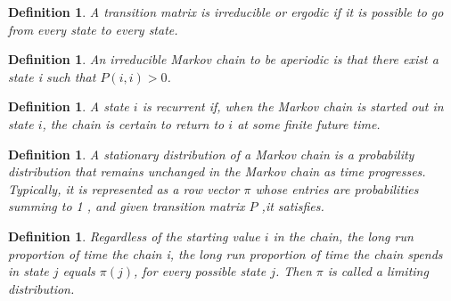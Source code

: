 \documentclass[11pt,a4paper]{article}
\theoremstyle{plain}
\newtheorem{de}[fact]{Definition}
\begin{document}
\begin{de}
A transition matrix is irreducible or ergodic if it is possible to go from every state to every state.
\end{de}

\begin{de}
 An irreducible Markov chain to be aperiodic is that there exist a state i such that $P(i,i) > 0$.
\end{de}
\begin{de}
A state $i$ is recurrent if, when the Markov chain is started out in state $i$, the chain is certain to return to $i$ at some finite future time.
\end{de}

\begin{de}
A stationary distribution of a Markov chain is a probability distribution that remains unchanged in the Markov chain as time progresses. Typically, it is represented as a row vector $\pi$ whose entries are probabilities summing to 1 , and given transition matrix $P$ ,it satisfies.
\end{de}
\begin{de}
Regardless of the starting value $i$ in the chain, the long run  proportion of time the chain i, the long run proportion of time the chain spends in state $j$ equals $\pi(j)$, for every possible state $j$. Then $\pi$ is called a limiting distribution.
\end{de} 
\end{document}
